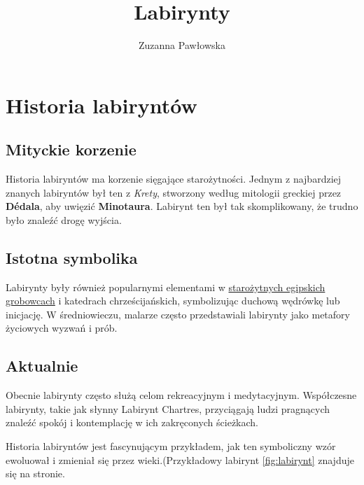 \begin{center}
\begin{LARGE}
\title{\textbf{Labirynty}}
\author{Zuzanna Pawłowska}
\end{LARGE}
\end{center}

\maketitle
\section{Historia labiryntów}
\subsection{Mityckie korzenie}
\begin{flushleft}
Historia labiryntów ma korzenie sięgające starożytności. Jednym z najbardziej znanych labiryntów był ten z \textit{Krety}, stworzony według mitologii greckiej przez \textbf{Dédala}, aby uwięzić \textbf{Minotaura}. Labirynt ten był tak skomplikowany, że trudno było znaleźć drogę wyjścia.
\end{flushleft}

\subsection{Istotna symbolika}
\begin{center}
Labirynty były również popularnymi elementami w \underline{starożytnych egipskich grobowcach} i katedrach chrześcijańskich, symbolizując duchową wędrówkę lub inicjację. W średniowieczu, malarze często przedstawiali labirynty jako metafory życiowych wyzwań i prób.
\end{center}

\subsection{Aktualnie}
\begin{flushright}
Obecnie labirynty często służą celom rekreacyjnym i medytacyjnym. Współczesne labirynty, takie jak słynny Labirynt Chartres, przyciągają ludzi pragnących znaleźć spokój i kontemplację w ich zakręconych ścieżkach.\par Historia labiryntów jest fascynującym przykładem, jak ten symboliczny wzór ewoluował i zmieniał się przez wieki.(Przykładowy labirynt \ref{fig:labirynt} znajduje się na \pageref{fig:labirynt} stronie.
\end{flushright}

